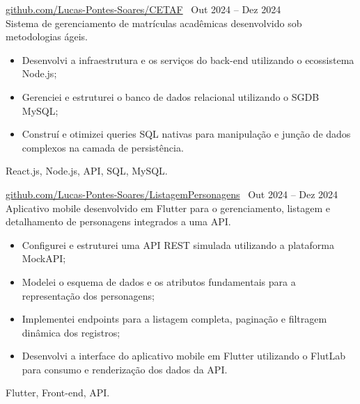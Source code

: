  \textbar{}  \href{https://github.com/Lucas-Pontes-Soares/CETAF}{github.com/Lucas-Pontes-Soares/CETAF} \hfill\ Out 2024 -- Dez 2024 \\
Sistema de gerenciamento de matrículas acadêmicas desenvolvido sob metodologias ágeis.
\begin{itemize}
    \item Desenvolvi a infraestrutura e os serviços do back-end utilizando o ecossistema Node.js;
    \item Gerenciei e estruturei o banco de dados relacional utilizando o SGDB MySQL;
    \item Construí e otimizei queries SQL nativas para manipulação e junção de dados complexos na camada de persistência.
\end{itemize}
 React.js, Node.js, API, SQL, MySQL.

        
 \textbar{}  \href{https://github.com/Lucas-Pontes-Soares/ListagemPersonagens}{github.com/Lucas-Pontes-Soares/ListagemPersonagens} \hfill\ Out 2024 -- Dez 2024 \\
Aplicativo mobile desenvolvido em Flutter para o gerenciamento, listagem e detalhamento de personagens integrados a uma API.
\begin{itemize}
    \item Configurei e estruturei uma API REST simulada utilizando a plataforma MockAPI;
    \item Modelei o esquema de dados e os atributos fundamentais para a representação dos personagens;
    \item Implementei endpoints para a listagem completa, paginação e filtragem dinâmica dos registros;
    \item Desenvolvi a interface do aplicativo mobile em Flutter utilizando o FlutLab para consumo e renderização dos dados da API.
\end{itemize}
 Flutter, Front-end, API.

        

